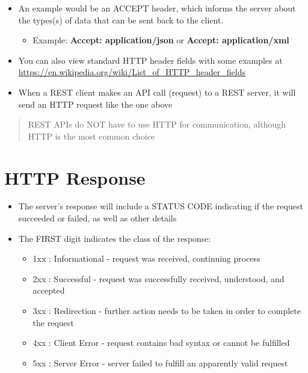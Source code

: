 \begin{itemize}
\item
  An example would be an ACCEPT header, which informs the server about
  the types(s) of data that can be sent back to the client.

  \begin{itemize}
  \tightlist
  \item
    Example: \textbf{Accept: application/json} or \textbf{Accept:
    application/xml}
  \end{itemize}
\item
  You can also view standard HTTP header fields with some examples at
  \url{https://en.wikipedia.org/wiki/List_of_HTTP_header_fields}
\item
  When a REST client makes an API call (request) to a REST server, it
  will send an HTTP request like the one above
\end{itemize}

\begin{quote}
REST APIs do NOT have to use HTTP for communication, although HTTP is
the most common choice
\end{quote}

\section{HTTP Response}\label{http-response}

\begin{itemize}
\tightlist
\item
  The server's response will include a STATUS CODE indicating if the
  request succeeded or failed, as well as other details
\item
  The FIRST digit indicates the class of the response:

  \begin{itemize}
  \tightlist
  \item
    1xx : Informational - request was received, continuing process
  \item
    2xx : Successful - request was successfully received, understood,
    and accepted
  \item
    3xx : Redirection - further action needs to be taken in order to
    complete the request
  \item
    4xx : Client Error - request contains bad syntax or cannot be
    fulfilled
  \item
    5xx : Server Error - server failed to fulfill an apparently valid
    request
  \end{itemize}
\end{itemize}


